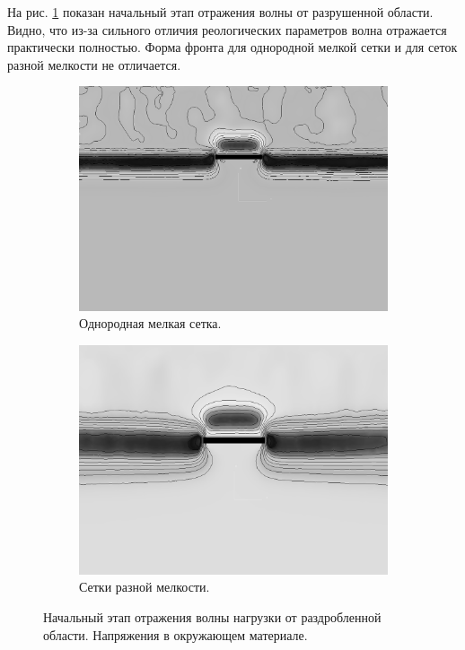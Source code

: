 На рис. \ref{pic:crack_reflection} показан начальный этап отражения волны от разрушенной области. Видно, что из-за сильного отличия реологических параметров волна отражается практически полностью. Форма фронта для однородной мелкой сетки и для сеток разной мелкости не отличается.

\begin{figure}[htp]
\begin{subfigure}[b]{0.5\textwidth}
\centering
\includegraphics[width=\textwidth]{png/wave-around-crack/reflection-uniform-mesh.png}
\caption{Однородная мелкая сетка.}
\end{subfigure}
\begin{subfigure}[b]{0.5\textwidth}
\centering
\includegraphics[width=\textwidth]{png/wave-around-crack/reflection-non-uniform-mesh.png}
\caption{Сетки разной мелкости.}
\end{subfigure}
\caption{Начальный этап отражения волны нагрузки от раздробленной области. Напряжения в окружающем материале.}
\label{pic:crack_reflection}
\end{figure}

